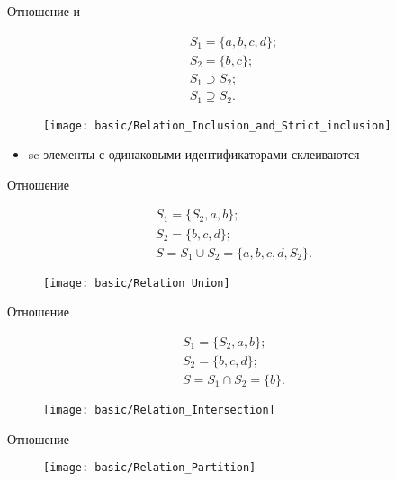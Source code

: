 \begin{frame}[shrink=10]{Отношение  и }
  \begin{center}
    \begin{eqnarray*}
      S_1 = \{ a, b, c, d \}; \\
      S_2 = \{ b, c \}; \\
      S_1 \supset S_2; \\
      S_1 \supseteq S_2.
    \end{eqnarray*}

    \objeqv

    \begin{figure}
      \texttt{[image: basic/Relation\_Inclusion\_and\_Strict\_inclusion]}
    \end{figure}
  \end{center}

  \begin{itemize}
  \item sc-элементы с одинаковыми идентификаторами склеиваются
  \end{itemize}
\end{frame}

\begin{frame}[shrink=10]{Отношение }
  \begin{center}
    \begin{eqnarray*}
      S_1 = \{ S_2, a, b \}; \\
      S_2 = \{ b, c, d \}; \\
      S = S_1 \cup S_2 = \{ a, b, c, d, S_2 \}.
    \end{eqnarray*}

    \objeqv

    \begin{figure}
      \texttt{[image: basic/Relation\_Union]}
    \end{figure}
  \end{center}
\end{frame}

\begin{frame}[shrink=10]{Отношение }
  \begin{center}
    \begin{eqnarray*}
      S_1 = \{ S_2, a, b \}; \\
      S_2 = \{ b, c, d \}; \\
      S = S_1 \cap S_2 = \{ b \}.
    \end{eqnarray*}

    \objeqv

    \begin{figure}
      \texttt{[image: basic/Relation\_Intersection]}
    \end{figure}
  \end{center}
\end{frame}

\begin{frame}[shrink=10]{Отношение }
  \begin{center}
    \begin{figure}
      \texttt{[image: basic/Relation\_Partition]}
    \end{figure}
  \end{center}
\end{frame}

